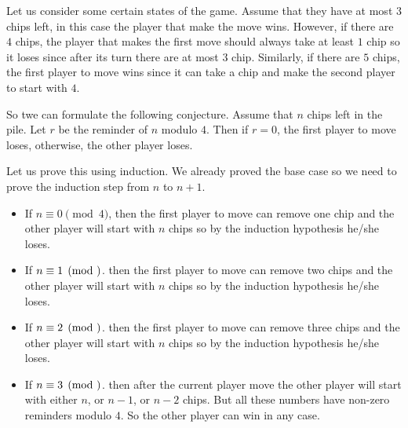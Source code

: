 Let us consider some certain states of the game.
Assume that they have at most $3$ chips left, in this case the player that make
the move wins. However, if there are $4$ chips, the
player that makes the first move should always take at least $1$ chip so it
loses since after its turn there are at most $3$ chip. Similarly, if there
are $5$ chips, the first player to move wins since it can take a chip and
make the second player to start with $4$.

So twe can formulate the following conjecture.
Assume that $n$ chips left in the pile. Let $r$ be the reminder of $n$ modulo
$4$. Then if $r = 0$, the first player to move loses, otherwise, the other
player loses.

Let us prove this using induction. We already proved the base case so
we need to prove the induction step from $n$ to $n + 1$.
\begin{itemize}
  \item If $n \equiv 0 \pmod{4}$, then the first player to move can remove one
    chip and the other player will start with $n$ chips so by the induction
    hypothesis he/she loses.
  \item If $n \equiv 1 \pmod$. then the first player to move can remove two
    chips and the other player will start with $n$ chips so by the induction
    hypothesis he/she loses.
  \item If $n \equiv 2 \pmod$. then the first player to move can remove three
    chips and the other player will start with $n$ chips so by the induction
    hypothesis he/she loses.
  \item If $n \equiv 3 \pmod$. then after the current player move the other
    player will start with either $n$, or $n - 1$, or $n - 2$ chips. But all
    these numbers have non-zero reminders modulo $4$. So the other player
    can win in any case.
\end{itemize}

